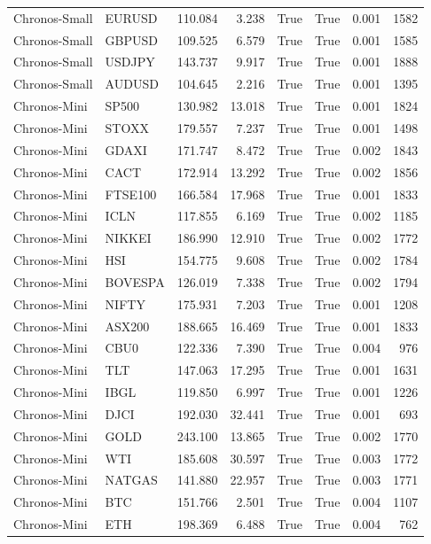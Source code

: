 \begin{table}[H]
\begin{tabular}{llrrrrrr}
Chronos-Small & EURUSD & 110.084 & 3.238 & True & True & 0.001 & 1582 \\
Chronos-Small & GBPUSD & 109.525 & 6.579 & True & True & 0.001 & 1585 \\
Chronos-Small & USDJPY & 143.737 & 9.917 & True & True & 0.001 & 1888 \\
Chronos-Small & AUDUSD & 104.645 & 2.216 & True & True & 0.001 & 1395 \\
Chronos-Mini & SP500 & 130.982 & 13.018 & True & True & 0.001 & 1824 \\
Chronos-Mini & STOXX & 179.557 & 7.237 & True & True & 0.001 & 1498 \\
Chronos-Mini & GDAXI & 171.747 & 8.472 & True & True & 0.002 & 1843 \\
Chronos-Mini & CACT & 172.914 & 13.292 & True & True & 0.002 & 1856 \\
Chronos-Mini & FTSE100 & 166.584 & 17.968 & True & True & 0.001 & 1833 \\
Chronos-Mini & ICLN & 117.855 & 6.169 & True & True & 0.002 & 1185 \\
Chronos-Mini & NIKKEI & 186.990 & 12.910 & True & True & 0.002 & 1772 \\
Chronos-Mini & HSI & 154.775 & 9.608 & True & True & 0.002 & 1784 \\
Chronos-Mini & BOVESPA & 126.019 & 7.338 & True & True & 0.002 & 1794 \\
Chronos-Mini & NIFTY & 175.931 & 7.203 & True & True & 0.001 & 1208 \\
Chronos-Mini & ASX200 & 188.665 & 16.469 & True & True & 0.001 & 1833 \\
Chronos-Mini & CBU0 & 122.336 & 7.390 & True & True & 0.004 & 976 \\
Chronos-Mini & TLT & 147.063 & 17.295 & True & True & 0.001 & 1631 \\
Chronos-Mini & IBGL & 119.850 & 6.997 & True & True & 0.001 & 1226 \\
Chronos-Mini & DJCI & 192.030 & 32.441 & True & True & 0.001 & 693 \\
Chronos-Mini & GOLD & 243.100 & 13.865 & True & True & 0.002 & 1770 \\
Chronos-Mini & WTI & 185.608 & 30.597 & True & True & 0.003 & 1772 \\
Chronos-Mini & NATGAS & 141.880 & 22.957 & True & True & 0.003 & 1771 \\
Chronos-Mini & BTC & 151.766 & 2.501 & True & True & 0.004 & 1107 \\
Chronos-Mini & ETH & 198.369 & 6.488 & True & True & 0.004 & 762 \\

\end{tabular}
\end{table}
